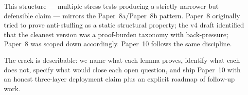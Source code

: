 \documentclass{article}
\begin{document}
This structure --- multiple stress-tests producing a strictly
narrower but defensible claim --- mirrors the Paper~8a/Paper~8b
pattern.  Paper~8 originally tried to prove anti-stuffing as a
static structural property; the v4 draft identified that the
cleanest version was a proof-burden taxonomy with back-pressure;
Paper~8 was scoped down accordingly.  Paper~10 follows the same
discipline.

The crack is describable: we name what each lemma proves, identify
what each does not, specify what would close each open question,
and ship Paper~10 with an honest three-layer deployment claim plus
an explicit roadmap of follow-up work.
\end{document}
